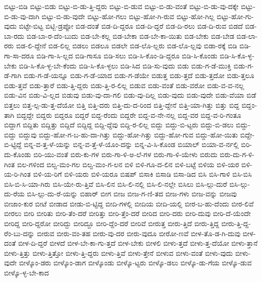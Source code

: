 {ಬಿಟ್ಟು-ಬಿಡಿ
ಬಿಟ್ಟು-ಬಿಡು
ಬಿಟ್ಟು-ಬಿ-ಡು-ತ್ತಿ-ದ್ದರು
ಬಿಟ್ಟು-ಬಿ-ಡುವ
ಬಿಟ್ಟು-ಬಿ-ಡು-ವಂತೆ
ಬಿಟ್ಟು-ಬಿ-ಡು-ವು-ದಕ್ಕೇ
ಬಿಟ್ಟು-ಬಿ-ಡು-ವು-ದಾಗಿ
ಬಿಟ್ಟು-ಬಿ-ಡು-ವುದೇ
ಬಿಟ್ಟು-ಹೋ-ಗಲು
ಬಿಟ್ಟು-ಹೋ-ಗಿ-ರುವ
ಬಿಟ್ಟು-ಹೋ-ಗಿಲ್ಲ
ಬಿಟ್ಟು-ಹೋ-ಗು-ವುದು
ಬಿಟ್ಟೇ-ಬಿಟ್ಟ
ಬಿಟ್ಬಿ-ಡ್ರಪ್ಪೋ
ಬಿಡ-ದಂತೆ
ಬಿಡ-ದಿ-ದ್ದರೂ
ಬಿಡ-ದಿ-ದ್ದರೆ
ಬಿಡ-ದಿ-ರಲು
ಬಿಡ-ದಿ-ರುವ
ಬಿಡದೆ
ಬಿಡ-ಬಾ-ರದು
ಬಿಡ-ಬಾ-ರ-ದೆಂ-ಬುದು
ಬಿಡ-ಬೇ-ಕಲ್ಲ
ಬಿಡ-ಬೇಕಾ
ಬಿಡ-ಬೇ-ಕಾ-ಯಿತು
ಬಿಡ-ಬೇಕು
ಬಿಡ-ಬೇಡ
ಬಿಡ-ಲಾ-ರರು
ಬಿಡ-ಲಿ-ದ್ದೇನೆ
ಬಿಡ-ಲಿಲ್ಲ
ಬಿಡಲು
ಬಿಡಲೂ
ಬಿಡಲೇ
ಬಿಡ-ಲೊ-ಲ್ಲರು
ಬಿಡ-ಲೊ-ಲ್ಲವು
ಬಿಡಾ-ರಕ್ಕೆ
ಬಿಡಿ
ಬಿಡಿ-ಗಾ-ಸಾ-ದರೂ
ಬಿಡಿ-ಗಾ-ಸಿ-ಲ್ಲದ
ಬಿಡಿ-ಗಾಸೂ
ಬಿಡಿ-ಸಲು
ಬಿಡಿ-ಸಿ-ಕೊಂ-ಡಿ-ದ್ದರೂ
ಬಿಡಿ-ಸಿ-ಕೊಂಡು
ಬಿಡಿ-ಸಿ-ಕೊ-ಳ್ಳ-ಬೇಕು
ಬಿಡಿ-ಸಿ-ಕೊ-ಳ್ಳ-ಬೇ-ಕೆಂದು
ಬಿಡಿ-ಸಿ-ಕೊ-ಳ್ಳಲು
ಬಿಡಿ-ಸಿದ
ಬಿಡಿ-ಸು-ವುದು
ಬಿಡು
ಬಿಡು-ಗ-ಡೆ-ಮುಕ್ತಿ
ಬಿಡು-ಗ-ಡೆ-ಗಾಗಿ
ಬಿಡು-ಗ-ಡೆ-ಯನ್ನೂ
ಬಿಡು-ಗ-ಡೆ-ಯಾದ
ಬಿಡು-ಗ-ಡೆಯೇ
ಬಿಡುತ್ತ
ಬಿಡು-ತ್ತದೆ
ಬಿಡು-ತ್ತದೋ
ಬಿಡು-ತ್ತಲೂ
ಬಿಡು-ತ್ತವೆ
ಬಿಡು-ತ್ತಾರೆ
ಬಿಡು-ತ್ತಿ-ದ್ದರು
ಬಿಡು-ತ್ತಿ-ರ-ಲಿಲ್ಲ
ಬಿಡುವ
ಬಿಡು-ವಂತೆ
ಬಿಡು-ವರೋ
ಬಿಡು-ವ-ವ-ನಲ್ಲ
ಬಿಡು-ವಿನ
ಬಿಡು-ವಿ-ಲ್ಲದ
ಬಿಡುವು
ಬಿಡು-ವು-ದಾ-ಗಲಿ
ಬಿಡು-ವು-ದಿಲ್ಲ
ಬಿಡು-ವುದು
ಬಿಡು-ವುದೇ
ಬಿಡು-ವೆಯಾ
ಬಿಡೆ
ಬಿತ್ತಲು
ಬಿತ್ತ-ಲ್ಪ-ಡು-ತ್ತ-ದೆಯೋ
ಬಿತ್ತಿ
ಬಿತ್ತಿ-ದರು
ಬಿತ್ತಿ-ದು-ದ-ರಿಂದ
ಬಿತ್ತಿ-ದ್ದೇನೆ
ಬಿತ್ತಿ-ಯಾ-ಗಿತ್ತು
ಬಿತ್ತು
ಬಿದ್ದ
ಬಿದ್ದಂ-ತಾಗಿ
ಬಿದ್ದದ್ದೇ
ಬಿದ್ದರು
ಬಿದ್ದರೂ
ಬಿದ್ದರೆ
ಬಿದ್ದ-ರೆಂದು
ಬಿದ್ದರೇ
ಬಿದ್ದ-ವ-ನೇ-ನಲ್ಲ
ಬಿದ್ದ-ವರ
ಬಿದ್ದ-ವ-ರಿ-ಗಂತೂ
ಬಿದ್ದಾಗ
ಬಿದ್ದಿತು
ಬಿದ್ದಿತ್ತು
ಬಿದ್ದಿದೆ
ಬಿದ್ದಿದ್ದ
ಬಿದ್ದಿ-ದ್ದೆವು
ಬಿದ್ದಿ-ರ-ಲಿಲ್ಲ
ಬಿದ್ದು
ಬಿದ್ದು-ಬಿ-ಟ್ಟರು
ಬಿದ್ದು-ಬಿ-ಡಲು
ಬಿದ್ದು-ಬಿದ್ದು
ಬಿದ್ದುವು
ಬಿದ್ದು-ಹೋ-ಗ-ಬ-ಹು-ದಾ-ಗಿತ್ತು
ಬಿದ್ದು-ಹೋ-ಗಿತ್ತು
ಬಿದ್ದು-ಹೋ-ಗುವ
ಬಿದ್ದು-ಹೋ-ಯಿತು
ಬಿದ್ದೇ-ಬಿ-ಟ್ಟಿದ್ದೆ
ಬಿನ್ನ-ವ-ತ್ತ-ಳೆ-ಯನ್ನು
ಬಿನ್ನ-ವ-ತ್ತೆ-ಳೆ-ಯೊಂ-ದನ್ನು
ಬಿನ್ನ-ವಿ-ಸಿ-ಕೊಂಡ
ಬಿಯಾಲ್
ಬಿಯಾ-ವ-ರ್ನಲ್ಲಿ
ಬಿರಿ-ದು-ಕೊಂಡು
ಬಿರಿ-ಯು-ವಂತೆ
ಬಿರು-ಕು-ಗಳ
ಬಿರು-ಗಾ-ಳಿ-ಅ-ಲೆ-ಗಳ
ಬಿರು-ಗಾ-ಳಿ-ಯೇಳು
ಬಿರುದು
ಬಿರು-ದು-ಗ-ಳಿ-ಗಿಂತ
ಬಿಲ-ಗಳಿಂದ
ಬಿಲ್ವ-ಮಂ-ಗಲ
ಬಿಲ್ವ-ಮಂ-ಗ-ಲನ
ಬಿಳಿ
ಬಿಳಿ-ಗೂ-ದ-ಲಿನ
ಬಿಳಿ-ಬಟ್ಟೆ
ಬಿಳಿಯ
ಬಿಳಿ-ಯರ
ಬಿಳಿ-ಯ-ರಿ-ಗಿಂತ
ಬಿಳಿ-ಯ-ರಿಗೆ
ಬಿಳಿ-ಯರು
ಬಿಳಿ-ಯರೂ
ಬಿಷಪ್
ಬಿಸಾಕಿ
ಬಿಸಾಡಿ
ಬಿಸಾ-ಡಿದ
ಬಿಸಿ
ಬಿಸಿ-ಗಾಳಿ
ಬಿಸಿ-ಬಿಸಿ
ಬಿಸಿ-ಬಿ-ಸಿ-ಯಾ-ಗಿರು
ಬಿಸಿ-ಯೇ-ರು-ತ್ತಿವೆ
ಬಿಸಿ-ಲಿನ
ಬಿಸಿ-ಲಿ-ನಲ್ಲಿ
ಬಿಸಿ-ಲಿ-ನಲ್ಲೇ
ಬಿಸಿಲು
ಬಿಸಿ-ಲ್ಗು-ದುರೆ
ಬಿಸಿ-ಲ್ಗು-ದು-ರೆಯ
ಬಿಸಿ-ಲ್ಗು-ದು-ರೆ-ಯನ್ನು
ಬಿಹಾರ್
ಬೀಗ
ಬೀಜ
ಬೀಜ-ಗ-ಣಿ-ತದ
ಬೀಜ-ಗಳು
ಬೀಜ-ವನ್ನು
ಬೀಜವು
ಬೀಜಾಂ-ಕುರ
ಬೀಟೆ
ಬೀಡಾದ
ಬೀಡು-ಬಿ-ಟ್ಟಿದ್ದ
ಬೀದಿ-ಗಳಲ್ಲಿ
ಬೀದಿಯ
ಬೀದಿ-ಯಲ್ಲಿ
ಬೀರ-ಬ-ಹು-ದೆಂದು
ಬೀರ-ಲಿವೆ
ಬೀರಲು
ಬೀರಿ
ಬೀರಿತು
ಬೀರಿ-ತೆಂ-ದರೆ
ಬೀರಿತ್ತು
ಬೀರಿ-ತ್ತೆಂ-ದರೆ
ಬೀರಿದ
ಬೀರಿ-ದರು
ಬೀರಿ-ದುವು
ಬೀರಿ-ದೆ-ಯೆಂದೇ
ಬೀರಿದ್ದ
ಬೀರಿ-ದ್ದರೋ
ಬೀರಿದ್ದು
ಬೀರಿದ್ದೂ
ಬೀರಿ-ದ್ದೆಂ-ದರೆ
ಬೀರಿವೆ
ಬೀರುತ್ತ
ಬೀರು-ತ್ತಿದೆ
ಬೀರು-ತ್ತಿದ್ದ
ಬೀರು-ತ್ತಿ-ದ್ದ-ರೆಂ-ಬು-ದನ್ನು
ಬೀರುವ
ಬೀರು-ವಂ-ತಹ
ಬೀರು-ವು-ದರ
ಬೀರು-ವುದೂ
ಬೀರೋ-ಣವೆ
ಬೀಳ-ತೊ-ಡ-ಗಿ-ದುವು
ಬೀಳ-ದಂತೆ
ಬೀಳ-ದಿ-ದ್ದರೆ
ಬೀಳದೆ
ಬೀಳ-ಬೇ-ಕಾ-ಗು-ತ್ತದೆ
ಬೀಳ-ಬೇಕು
ಬೀಳಲಿ
ಬೀಳು-ತ್ತದೆ
ಬೀಳು-ತ್ತ-ದೆಯೋ
ಬೀಳು-ತ್ತಾನೆ
ಬೀಳು-ತ್ತಿತ್ತು
ಬೀಳು-ತ್ತಿತ್ತೋ
ಬೀಳು-ತ್ತಿ-ದ್ದರು
ಬೀಳು-ತ್ತಿವೆ
ಬೀಳು-ತ್ತೇನೆ
ಬೀಳುವ
ಬೀಳು-ವಂತೆ
ಬೀಳು-ವುದು
ಬೀಳು-ವುದೇ
ಬೀಳ್ಕೊಂ-ಡರು
ಬೀಳ್ಕೊಂ-ಡಾಗ
ಬೀಳ್ಕೊಂಡು
ಬೀಳ್ಕೊ-ಟ್ಟರು
ಬೀಳ್ಕೊ-ಡಲು
ಬೀಳ್ಕೊ-ಡು-ಗೆಯ
ಬೀಳ್ಕೊ-ಡುವ
ಬೀಳ್ಕೊ-ಳ್ಳ-ಬೇ-ಕಾದ
}
